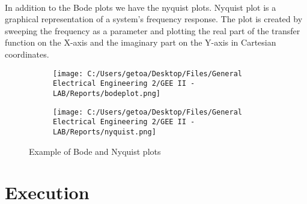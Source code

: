 \documentclass[12pt]{report}
\begin{document}
\\ In addition to the Bode plots we have the nyquist plots. Nyquist plot is a graphical representation of a system's frequency response. The plot is created by sweeping the frequency as a parameter and plotting the real part of the transfer function on the X-axis and the imaginary part on the Y-axis in Cartesian coordinates. 
\vspace{-0.3cm}
\begin{figure}[!htp]
    \centering
    \begin{subfigure}[b]{0.35 \textwidth}
        \centering
        \texttt{[image: C:/Users/getoa/Desktop/Files/General Electrical Engineering 2/GEE II - LAB/Reports/bodeplot.png]}
        \label{fig:bode_plot}
    \end{subfigure}%
    \hfill
    \begin{subfigure}[b]{0.6\textwidth}
        \centering
        \texttt{[image: C:/Users/getoa/Desktop/Files/General Electrical Engineering 2/GEE II - LAB/Reports/nyquist.png]}
        \label{fig:nyquist_plot}
    \end{subfigure}%
    \caption{Example of Bode and Nyquist plots}
    \label{fig:bode_and_nyquist}
\end{figure}

\chapter{Execution}
\end{document}
